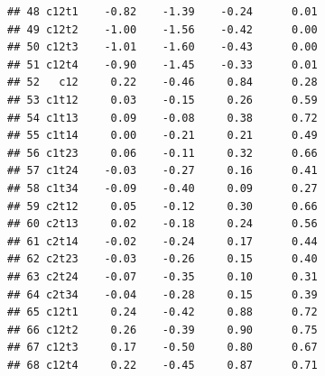 \documentclass[
]{article}
\begin{document}
\begin{verbatim}
## 48 c12t1    -0.82    -1.39    -0.24      0.01     
## 49 c12t2    -1.00    -1.56    -0.42      0.00     
## 50 c12t3    -1.01    -1.60    -0.43      0.00     
## 51 c12t4    -0.90    -1.45    -0.33      0.01     
## 52   c12     0.22    -0.46     0.84      0.28     
## 53 c1t12     0.03    -0.15     0.26      0.59     
## 54 c1t13     0.09    -0.08     0.38      0.72     
## 55 c1t14     0.00    -0.21     0.21      0.49     
## 56 c1t23     0.06    -0.11     0.32      0.66     
## 57 c1t24    -0.03    -0.27     0.16      0.41     
## 58 c1t34    -0.09    -0.40     0.09      0.27     
## 59 c2t12     0.05    -0.12     0.30      0.66     
## 60 c2t13     0.02    -0.18     0.24      0.56     
## 61 c2t14    -0.02    -0.24     0.17      0.44     
## 62 c2t23    -0.03    -0.26     0.15      0.40     
## 63 c2t24    -0.07    -0.35     0.10      0.31     
## 64 c2t34    -0.04    -0.28     0.15      0.39     
## 65 c12t1     0.24    -0.42     0.88      0.72     
## 66 c12t2     0.26    -0.39     0.90      0.75     
## 67 c12t3     0.17    -0.50     0.80      0.67     
## 68 c12t4     0.22    -0.45     0.87      0.71
\end{verbatim}
\end{document}
